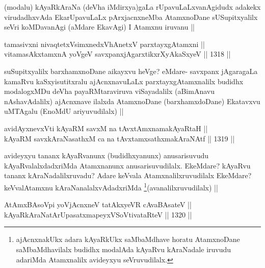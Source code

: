 \begin{artha}
(modalu) kAyaRkAraNa (deVha iMdirxya)gaLa rUpavuLaLxvanAgidudx adakekx virudadhxvAda EkarUpavuLaLx pArxjacnxneMba AtamxnoDane sUSupitxyalilx seVri koMDavanAgi (aMdare EkavAgi) I Atamxnu iruvanu ||
\end{artha}

\begin{shl}
tamasivxni nivaqtetxV\s simxnedxVhAnetxV parxtayxgAtamxni || \\
vitamasAkxtamxnA yoVgeV savxpanxjAgarxtikxrXyAkaSxyeV ||  1318 ||  
\end{shl}

\begin{artha}
suSupitxyalilx barxhamxnoDane aikayxvu heVge? eMdare- savxpanx jAgaragaLa kamaRvu kaSxyisutitxralu ajAcnxnavuLaLx parxtayxgAtamxnalilx budidhx modalogxMDu deVha payaRMtaraviruva viSayadalilx (aBimAnavu nAshavAdalilx) ajAcnxnave ilalxda AtamxnoDane (barxhamxdoDane) Ekatavxvu uMTAgalu (EnoMdU ariyuvudilalx) ||
\end{artha}


\begin{shl}
avidAyx\s nevxVti kAyaRM savxM na tAvxtAmxnamakAyaRtaH || \\
kAyaRM savxkAraNasathxM ca na tAvxtamxsathxmakAraNAtf ||  1319 || 
\end{shl}

\begin{artha}
avideyxyu tananx kAyaRvanunx (budidhxyanunx) anusarisuvudu kAyaRvalalxdadxriMda Atamxnanunx anusarisuvudilalx. EkeMdare? kAyaRvu tananx kAraNadalilxruvadu? Adare keVvala Atamxnalilxruvudilalx EkeMdare? keVvalAtamxnu kAraNanalalxvAdadxriMda \footnote{ajAcnxnakUkx adara kAyaRkUkx saMbaMdhave horatu AtamxnoDane saMbaMdhavilalx budidhx modalAda kAyaRvu kAraNadale iruvudu adariMda Atamxnalilx avideyxyu seVruvudilalx.}(avanalilxruvudilalx) ||
\end{artha}


\begin{shl}
AtAmxBAsoV\s pi yoV\s jAcnxneV tatAkxyeVR cAvaBAsateV || \\
kAyaRkAraNatArUpasatxmapeyxVSoV\s tivataRteV ||  1320 ||  
\end{shl}

